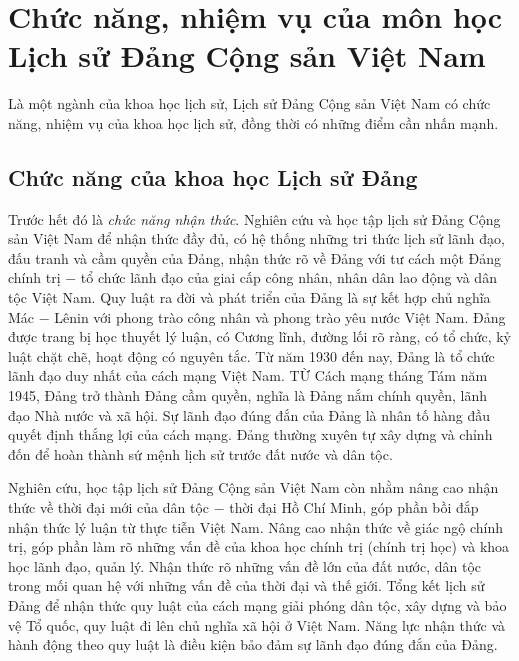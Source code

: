 \section{Chức năng, nhiệm vụ của môn học Lịch sử Đảng Cộng sản Việt Nam}
Là một ngành của khoa học lịch sử, Lịch sử Đảng Cộng sản Việt Nam có chức năng, nhiệm vụ của khoa học lịch sử, đồng thời có những điểm cần nhấn mạnh.
\subsection{Chức năng của khoa học Lịch sử Đảng}
Trước hết đó là \textit{chức năng nhận thức}. Nghiên cứu và học tập lịch sử Đảng Cộng sản Việt Nam để nhận thức đầy đủ, có hệ thống những tri thức lịch sử lãnh đạo, đấu tranh và cầm quyền của Đảng, nhận thức rõ về Đảng với tư cách một Đảng chính trị $-$ tổ chức lãnh đạo của giai cấp công nhân, nhân dân lao động và dân tộc Việt Nam. Quy luật ra đời và phát triển của Đảng là sự kết hợp chủ nghĩa Mác $-$ Lênin với phong trào công nhân và phong trào yêu nước Việt Nam. Đảng được trang bị học thuyết lý luận, có Cương lĩnh, đường lối rõ ràng, có tổ chức, kỷ luật chặt chẽ, hoạt động có nguyên tắc. Từ năm 1930 đến nay, Đảng là tổ chức lãnh đạo duy nhất của cách mạng Việt Nam. TỪ Cách mạng tháng Tám năm 1945, Đảng trở thành Đảng cầm quyền, nghĩa là Đảng nắm chính quyền, lãnh đạo Nhà nước và xã hội. Sự lãnh đạo đúng đắn của Đảng là nhân tố hàng đầu quyết định thắng lợi của cách mạng. Đảng thường xuyên tự xây dựng và chỉnh đốn để hoàn thành sứ mệnh lịch sử trước đất nước và dân tộc.

Nghiên cứu, học tập lịch sử Đảng Cộng sản Việt Nam còn nhằm nâng cao nhận thức về thời đại mới của dân tộc $-$ thời đại Hồ Chí Minh, góp phần bồi đắp nhận thức lý luận từ thực tiễn Việt Nam. Nâng cao nhận thức về giác ngộ chính trị, góp phần làm rõ những vấn đề của khoa học chính trị (chính trị học) và khoa học lãnh đạo, quản lý. Nhận thức rõ những vấn đề lớn của đất nước, dân tộc trong mối quan hệ với những vấn đề của thời đại và thế giới. Tổng kết lịch sử Đảng để nhận thức quy luật của cách mạng giải phóng dân tộc, xây dựng và bảo vệ Tổ quốc, quy luật đi lên chủ nghĩa xã hội ở Việt Nam. Năng lực nhận thức và hành động theo quy luật là điều kiện bảo đảm sự lãnh đạo đúng đắn của Đảng. 


